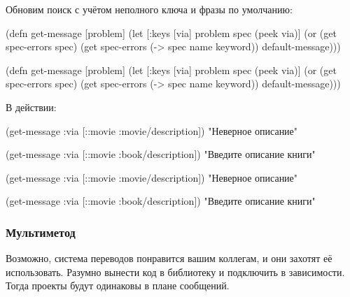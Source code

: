 \fi

Обновим поиск с учётом неполного ключа и фразы по умолчанию:

\ifx\devicetype\mobile

\begin{english}
  \begin{clojure}
(defn get-message
  [problem]
  (let [{:keys [via]} problem
        spec (peek via)]
    (or (get spec-errors spec)
        (get spec-errors
          (-> spec name keyword))
        default-message)))
  \end{clojure}
\end{english}

\else

\begin{english}
  \begin{clojure}
(defn get-message
  [problem]
  (let [{:keys [via]} problem
        spec (peek via)]
    (or (get spec-errors spec)
        (get spec-errors (-> spec name keyword))
        default-message)))
  \end{clojure}
\end{english}

\fi

\noindent
В действии:

\ifx\devicetype\mobile

  \begin{clojure}
(get-message
  {:via [::movie :movie/description]})
"Неверное описание"

(get-message
  {:via [::movie :book/description]})
"Введите описание книги"
  \end{clojure}

\else

  \begin{clojure}
(get-message {:via [::movie :movie/description]})
"Неверное описание"

(get-message {:via [::movie :book/description]})
"Введите описание книги"
  \end{clojure}

\fi

\subsubsection{Мультиметод}

Возможно, система переводов понравится вашим коллегам, и они захотят её
использовать. Разумно вынести код в библиотеку и подключить в зависимости. Тогда
проекты будут одинаковы в плане сообщений.

